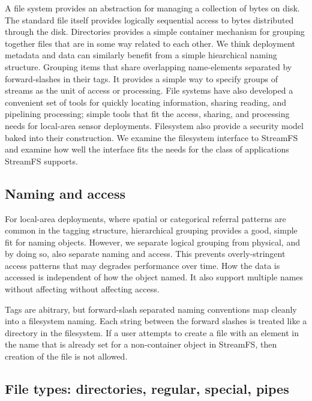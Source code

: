 \documentclass[10pt,print,letterpaper]{sigplan-proc-varsize}
\begin{document}

A file system provides an abstraction for managing a collection of bytes on disk.  The standard file itself
provides logically sequential access to bytes distributed through the disk.  Directories provides a simple
container mechanism for grouping together files that are in some way related to each other.  We think deployment
metadata and data can similarly benefit from a simple hiearchical naming structure.  Grouping items that share
overlapping name-elements separated by forward-slashes in their tags.  It provides a simple
way to specify groups of streams as the unit of access or processing.  File systems have also developed
a convenient set of tools for quickly locating information, sharing reading, and pipelining processing; simple
tools that fit the access, sharing, and processing needs for local-area sensor deployments.  Filesystem also
provide a security model baked into their construction.  We examine the filesystem interface to StreamFS and 
examine how well the interface fits the needs for the class of applications StreamFS supports.


\subsection{Naming and access}
For local-area deployments, where spatial or categorical referral patterns are common in the tagging structure, 
hierarchical grouping provides a good, simple fit for naming objects.  However, we separate logical grouping from physical, 
and by doing so, also separate naming and access.  This prevents overly-stringent access patterns that may degrades 
performance over time.  How the data is accessed is independent of how the object named.  It also support multiple names without
affecting without affecting access.

Tags are abitrary, but forward-slash separated naming conventions map cleanly into a filesystem naming.  Each 
string between the forward slashes is treated like a directory in the filesystem.  If a user attempts to 
create a file with an element in the name that is already set for a non-container object in StreamFS, then creation
of the file is not allowed.

\subsection{File types: directories, regular, special, pipes}
\end{document}
